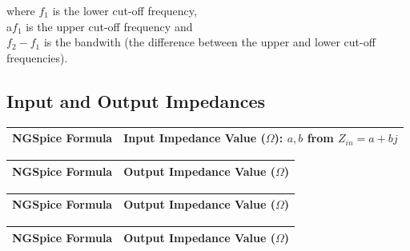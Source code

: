where $f_1$ is the lower cut-off frequency,\\
a$f_1$ is the upper cut-off frequency and\\
$f_2-f_1$ is the bandwith (the difference between the upper and lower cut-off frequencies).


\subsection{Input and Output Impedances}

\begin{table}[H] \centering
  \begin{tabular}{|l|r|}
    \hline    
    {\bf NGSpice Formula} & {\bf Input Impedance Value ($\Omega$): $a,b$ from $Z_{in}=a+bj$}\\ \hline
    
  \end{tabular}
 \label{tab:inputimp}
\end{table}

\begin{table}[H] \centering
  \begin{tabular}{|l|r|}
    \hline    
    {\bf NGSpice Formula} & {\bf Output Impedance Value ($\Omega$)}\\ \hline
    
  \end{tabular}
 \label{tab:outimp}
\end{table}

\begin{table}[H] \centering
  \begin{tabular}{|l|r|}
    \hline    
    {\bf NGSpice Formula} & {\bf Output Impedance Value ($\Omega$)}\\ \hline
    
  \end{tabular}
 \label{tab:inputimp2}
\end{table}

\begin{table}[H] \centering
  \begin{tabular}{|l|r|}
    \hline    
    {\bf NGSpice Formula} & {\bf Output Impedance Value ($\Omega$)}\\ \hline
    
  \end{tabular}
 \label{tab:outimp2}
\end{table}
